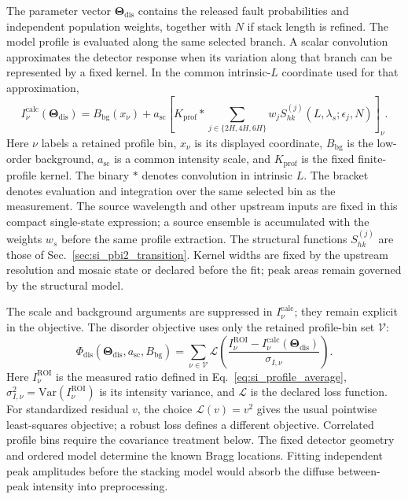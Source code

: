 The parameter vector $\boldsymbol{\Theta}_{\mathrm{dis}}$ contains the released fault probabilities and independent population weights, together with $N$ if stack length is refined. The model profile is evaluated along the same selected branch. A scalar convolution approximates the detector response when its variation along that branch can be represented by a fixed kernel. In the common intrinsic-$L$ coordinate used for that approximation,
\begin{equation}
 I_\nu^{\mathrm{calc}}(\boldsymbol{\Theta}_{\mathrm{dis}})
 =B_{\mathrm{bg}}(x_\nu)+a_{\mathrm{sc}}
 \left[K_{\mathrm{prof}}*\sum_{j\in\{2H,4H,6H\}}
 w_jS_{hk}^{(j)}(L,\lambda_s;\epsilon_j,N)\right]_\nu.
 \label{eq:si_disorder_profile_model}
\end{equation}
Here $\nu$ labels a retained profile bin, $x_\nu$ is its displayed coordinate, $B_{\mathrm{bg}}$ is the low-order background, $a_{\mathrm{sc}}$ is a common intensity scale, and $K_{\mathrm{prof}}$ is the fixed finite-profile kernel. The binary $*$ denotes convolution in intrinsic $L$. The bracket denotes evaluation and integration over the same selected bin as the measurement. The source wavelength and other upstream inputs are fixed in this compact single-state expression; a source ensemble is accumulated with the weights $w_s$ before the same profile extraction. The structural functions $S_{hk}^{(j)}$ are those of Sec.~\ref{sec:si_pbi2_transition}. Kernel widths are fixed by the upstream resolution and mosaic state or declared before the fit; peak areas remain governed by the structural model.

The scale and background arguments are suppressed in $I_\nu^{\mathrm{calc}}$; they remain explicit in the objective. The disorder objective uses only the retained profile-bin set $\mathcal V$:
\begin{equation}
 \Phi_{\mathrm{dis}}(\boldsymbol{\Theta}_{\mathrm{dis}},a_{\mathrm{sc}},B_{\mathrm{bg}})
 =\sum_{\nu\in\mathcal V}\mathcal L\!\left(
 \frac{I_\nu^{\mathrm{ROI}}-I_\nu^{\mathrm{calc}}(\boldsymbol{\Theta}_{\mathrm{dis}})}{\sigma_{I,\nu}}
 \right).
 \label{eq:si_disorder_objective}
\end{equation}
Here $I_\nu^{\mathrm{ROI}}$ is the measured ratio defined in Eq.~\eqref{eq:si_profile_average}, $\sigma_{I,\nu}^2=\mathrm{Var}(I_\nu^{\mathrm{ROI}})$ is its intensity variance, and $\mathcal L$ is the declared loss function. For standardized residual $v$, the choice $\mathcal L(v)=v^2$ gives the usual pointwise least-squares objective; a robust loss defines a different objective. Correlated profile bins require the covariance treatment below. The fixed detector geometry and ordered model determine the known Bragg locations. Fitting independent peak amplitudes before the stacking model would absorb the diffuse between-peak intensity into preprocessing.

